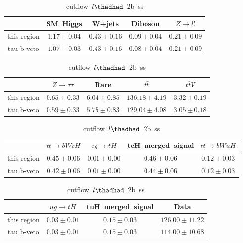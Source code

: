 \begin{table}
\footnotesize
\caption{cutflow~$l\thadhad$~2b~ss}
\centering
\begin{tabular}{|c|c|c|c|c|} \hline
 & SM~Higgs & W+jets & Diboson & $Z\to ll$\\\hline
this region & $1.17\pm0.04$ & $0.43\pm0.16$ & $0.09\pm0.04$ & $0.21\pm0.09$\\\hline
tau b-veto & $1.07\pm0.03$ & $0.43\pm0.16$ & $0.08\pm0.04$ & $0.21\pm0.09$\\\hline
\end{tabular}
\begin{tabular}{|c|c|c|c|c|} \hline
 & $Z\to \tau\tau$ & Rare & $t\bar{t}$ & $t\bar{t}V$\\\hline
this region & $0.65\pm0.33$ & $6.04\pm0.85$ & $136.18\pm4.19$ & $3.32\pm0.19$\\\hline
tau b-veto & $0.59\pm0.33$ & $5.75\pm0.83$ & $129.04\pm4.08$ & $3.05\pm0.18$\\\hline
\end{tabular}
\begin{tabular}{|c|c|c|c|c|} \hline
 & $\bar{t}t\to bWcH$ & $cg\to tH$ & tcH~merged~signal & $\bar{t}t\to bWuH$\\\hline
this region & $0.45\pm0.06$ & $0.01\pm0.00$ & $0.46\pm0.06$ & $0.12\pm0.03$\\\hline
tau b-veto & $0.42\pm0.06$ & $0.01\pm0.00$ & $0.44\pm0.06$ & $0.12\pm0.03$\\\hline
\end{tabular}
\begin{tabular}{|c|c|c|c|} \hline
 & $ug\to tH$ & tuH~merged~signal & Data\\\hline
this region & $0.03\pm0.01$ & $0.15\pm0.03$ & $126.00\pm11.22$\\\hline
tau b-veto & $0.03\pm0.01$ & $0.15\pm0.03$ & $114.00\pm10.68$\\\hline
\end{tabular}
\label{tab:cutflow_reg1l2tau2bnj_ss}
\end{table}
